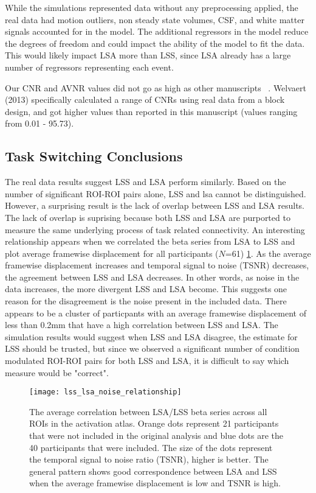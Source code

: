 \documentclass[10pt,letterpaper]{article}
\begin{document}
While the simulations represented data without any preprocessing applied,
the real data had motion outliers, non steady state volumes,
CSF, and white matter signals accounted for in the model.
The additional regressors in the model reduce the degrees of freedom
and could impact the ability of the model to fit the data.
This would likely impact LSA more than LSS, since LSA already has
a large number of regressors representing each event.

Our CNR and AVNR values did not go as high as other manuscripts ~\cite{Mumford2012,Abdulrahman2016,Welvaert2013a}.
Welvaert (2013)\cite{Welvaert2013a} specifically calculated a range of CNRs using real data from a block design,
and got higher values than reported in this manuscript (values ranging from 0.01 - 95.73).

\subsection*{Task Switching Conclusions}
\label{discussion:taskswitching-conclusions}

The real data results suggest LSS and LSA perform similarly.
Based on the number of significant ROI-ROI pairs alone, LSS and lsa
cannot be distinguished.
However, a surprising result is the lack of overlap between LSS and LSA results.
The lack of overlap is suprising because both LSS and LSA are purported to
measure the same underlying process of task related connectivity.
An interesting relationship appears when we correlated the beta series from
LSA to LSS and plot average framewise displacement for all participants ($N$=61) \ref{fig:lss_lsa_correlation}.
As the average framewise displacement increases and temporal signal to noise (TSNR)
decreases, the agreement between LSS and LSA decreases.
In other words, as noise in the data increases, the more divergent LSS and LSA become.
This suggests one reason for the disagreement is the noise present in the included
data.
There appears to be a cluster of particpants with an average framewise displacement of
less than 0.2mm that have a high correlation between LSS and LSA.
The simulation results would suggest when LSS and LSA disagree, the estimate for LSS should be
trusted, but since we observed a significant number of condition modulated ROI-ROI pairs for both
LSS and LSA, it is difficult to say which measure would be "correct".

\begin{figure}[H]
  \centering
  \texttt{[image: lss\_lsa\_noise\_relationship]}
  \caption{
    The average correlation between LSA/LSS beta series across
    all ROIs in the activation atlas.
    Orange dots represent 21 participants that were not included
    in the original analysis and blue dots are the 40
    participants that were included.
    The size of the dots represent the temporal signal to noise
    ratio (TSNR), higher is better.
    The general pattern shows good correspondence between LSA and LSS
    when the average framewise displacement is low and TSNR is high.
  }
  \label{fig:lss_lsa_correlation}
\end{figure}
\end{document}

